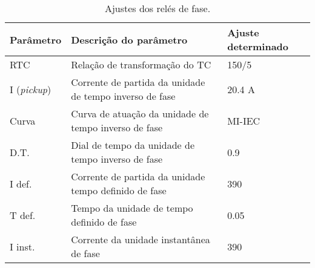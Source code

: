 \begin{table}[H]
\centering
\caption{Ajustes dos relés de fase.}
\label{table:1}
\begin{adjustbox}{width=\columnwidth,center}
\begin{tabular}{|l|l|l|}
\hline
\textbf{Parâmetro} & \textbf{Descrição do parâmetro} & \textbf{Ajuste determinado} \\ \hline

RTC & Relação de transformação do TC & 150/5\\ \hline
I (\textit{pickup}) &  Corrente de partida da unidade de tempo inverso de fase & 20.4 A\\ \hline
Curva & Curva de atuação da unidade de tempo inverso de fase & MI-IEC\\ \hline
D.T. & Dial de tempo da unidade de tempo inverso de fase & 0.9\\ \hline
I def. & Corrente de partida da unidade tempo definido de fase & 390\\ \hline
T def. & Tempo da unidade de tempo definido de fase & 0.05\\ \hline
I inst. & Corrente da unidade instantânea de fase & 390\\ \hline
\end{tabular}
\end{adjustbox}
\end{table}
